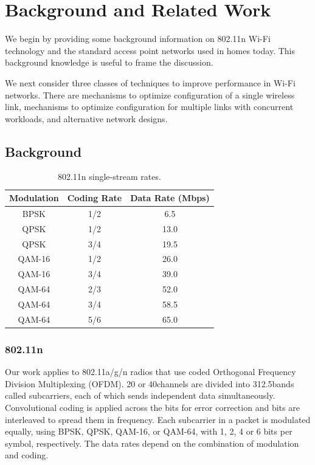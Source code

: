 \section{Background and Related Work}
\label{sec:related}
We begin by providing some background information on 802.11n Wi-Fi technology and the standard access point networks used in homes today. This background knowledge is useful to frame the discussion.

We next consider three classes of techniques to improve performance in Wi-Fi networks. There are mechanisms to optimize configuration of a single wireless link, mechanisms to optimize configuration for multiple links with concurrent workloads, and alternative network designs.

\subsection{Background}

\begin{table}
\centering
\begin{tabular}{ccc}
\toprule
Modulation & Coding Rate & Data Rate (Mbps) \\
\midrule
BPSK & 1/2 & 6.5 \\
QPSK & 1/2 & 13.0\\
QPSK & 3/4 & 19.5\\
QAM-16 & 1/2 & 26.0\\
QAM-16 & 3/4 & 39.0\\
QAM-64 & 2/3 & 52.0\\
QAM-64 & 3/4 & 58.5\\
QAM-64 & 5/6 & 65.0\\
\bottomrule
\end{tabular}
\caption{\label{tab:siso_mcs} 802.11n single-stream rates.}
\end{table}

\subsubsection{802.11n}
Our work applies to 802.11a/g/n radios that use coded Orthogonal Frequency Division Multiplexing (OFDM). 20 or 40\MHz channels are divided into 312.5\kHz bands called subcarriers, each of which sends independent data simultaneously. Convolutional coding is applied across the bits for error correction and bits are interleaved to spread them in frequency. 
Each subcarrier in a packet is modulated equally, using BPSK, QPSK, QAM-16, or QAM-64, with 1, 2, 4 or 6 bits per symbol, respectively. 
The data rates depend on the combination of modulation and coding. 

